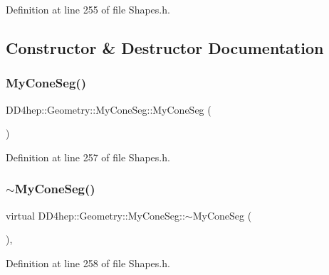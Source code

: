 Definition at line 255 of file Shapes.\+h.



\subsection{Constructor \& Destructor Documentation}
\hypertarget{class_d_d4hep_1_1_geometry_1_1_my_cone_seg_a9979507bda1f61e91e7859b4b6144025}{}\label{class_d_d4hep_1_1_geometry_1_1_my_cone_seg_a9979507bda1f61e91e7859b4b6144025} 
\subsubsection{\texorpdfstring{My\+Cone\+Seg()}{MyConeSeg()}}
{\footnotesize\ttfamily D\+D4hep\+::\+Geometry\+::\+My\+Cone\+Seg\+::\+My\+Cone\+Seg (\begin{DoxyParamCaption}{ }\end{DoxyParamCaption})\hspace{0.3cm}{\ttfamily [inline]}}



Definition at line 257 of file Shapes.\+h.

\hypertarget{class_d_d4hep_1_1_geometry_1_1_my_cone_seg_a0042f0670c9b2367a0b8512564fc9b80}{}\label{class_d_d4hep_1_1_geometry_1_1_my_cone_seg_a0042f0670c9b2367a0b8512564fc9b80} 
\subsubsection{\texorpdfstring{$\sim$\+My\+Cone\+Seg()}{~MyConeSeg()}}
{\footnotesize\ttfamily virtual D\+D4hep\+::\+Geometry\+::\+My\+Cone\+Seg\+::$\sim$\+My\+Cone\+Seg (\begin{DoxyParamCaption}{ }\end{DoxyParamCaption})\hspace{0.3cm}{\ttfamily [inline]}, {\ttfamily [virtual]}}



Definition at line 258 of file Shapes.\+h.



